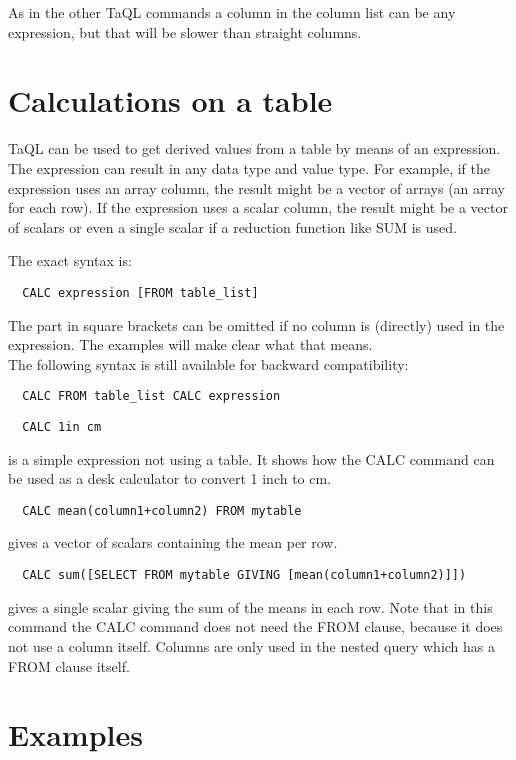 As in the other TaQL commands a column in the column list can be any
expression, but that will be slower than straight columns.

\section{\label{TAQL:CALCULATING}Calculations on a table}
TaQL can be used to get derived values from a table by means of an
expression. The expression can result in any data type and value type.
For example, if the expression uses an array column, the result might
be a vector of arrays (an array for each row). If the expression uses
a scalar column, the result might be a vector of scalars or even a
single scalar if a reduction function like SUM is used.

The exact syntax is:
\begin{verbatim}
  CALC expression [FROM table_list]
\end{verbatim}
The part in square brackets can be omitted if no column is (directly)
used in the expression. The examples will make clear what that means.
\\The following syntax is still available for backward compatibility:
\begin{verbatim}
  CALC FROM table_list CALC expression
\end{verbatim}

\begin{verbatim}
  CALC 1in cm
\end{verbatim}
is a simple expression not using a table. It shows how the CALC
command can be used as a desk calculator to convert 1 inch to cm.

\begin{verbatim}
  CALC mean(column1+column2) FROM mytable
\end{verbatim}
gives a vector of scalars containing the mean per row.

\begin{verbatim}
  CALC sum([SELECT FROM mytable GIVING [mean(column1+column2)]])
\end{verbatim}
gives a single scalar giving the sum of the means in each row.
Note that in this command the CALC command does not need the FROM
clause, because it does not use a column itself. Columns are only
used in the nested query which has a FROM clause itself.

\section{Examples}
